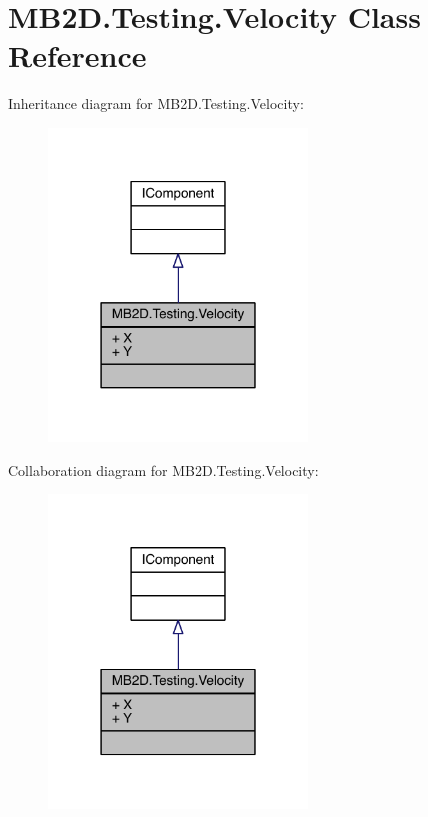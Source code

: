 \hypertarget{class_m_b2_d_1_1_testing_1_1_velocity}{}\section{M\+B2\+D.\+Testing.\+Velocity Class Reference}
\label{class_m_b2_d_1_1_testing_1_1_velocity}


Inheritance diagram for M\+B2\+D.\+Testing.\+Velocity\+:
\nopagebreak
\begin{figure}[H]
\begin{center}
\leavevmode
\includegraphics[width=195pt]{class_m_b2_d_1_1_testing_1_1_velocity__inherit__graph}
\end{center}
\end{figure}


Collaboration diagram for M\+B2\+D.\+Testing.\+Velocity\+:
\nopagebreak
\begin{figure}[H]
\begin{center}
\leavevmode
\includegraphics[width=195pt]{class_m_b2_d_1_1_testing_1_1_velocity__coll__graph}
\end{center}
\end{figure}
